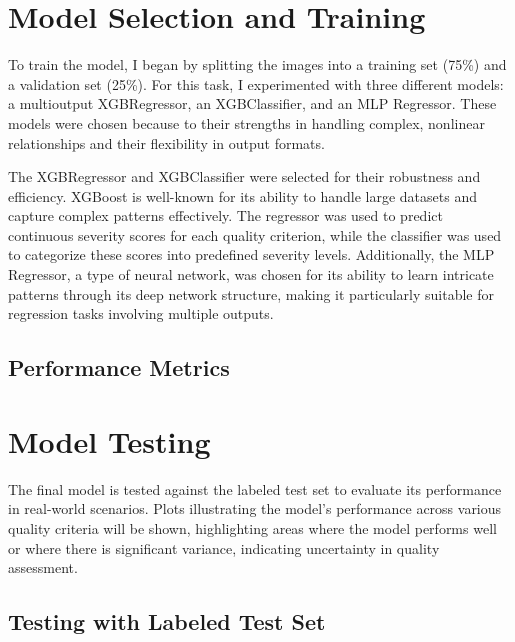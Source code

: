\section{Model Selection and Training}
\label{sec:ModelTraining}
To train the model, I began by splitting the images into a training set (75\%) and a validation set (25\%). For this task, I experimented with three different models: a multioutput XGBRegressor, an XGBClassifier, and an MLP Regressor. These models were chosen because to their strengths in handling complex, nonlinear relationships and their flexibility in output formats. \par
\vspace{\baselineskip}
\noindent
The XGBRegressor and XGBClassifier were selected for their robustness and efficiency. XGBoost is well-known for its ability to handle large datasets and capture complex patterns effectively. The regressor was used to predict continuous severity scores for each quality criterion, while the classifier was used to categorize these scores into predefined severity levels. Additionally, the MLP Regressor, a type of neural network, was chosen for its ability to learn intricate patterns through its deep network structure, making it particularly suitable for regression tasks involving multiple outputs. \par

\subsection{Performance Metrics}
\label{sub:PerfMetrics}


\section{Model Testing}
\label{sec:ModelTesting}
The final model is tested against the labeled test set to evaluate its performance in real-world scenarios. Plots illustrating the model’s performance across various quality criteria will be shown, highlighting areas where the model performs well or where there is significant variance, indicating uncertainty in quality assessment. \par
\vspace{\baselineskip}
\noindent

\subsection{Testing with Labeled Test Set}
\label{sub:TestLabeledSet}